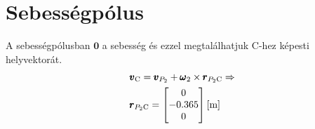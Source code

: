 \section{Sebességpólus}
A sebességpólusban $\pmb{0}$ a sebesség és ezzel megtalálhatjuk $\text{C}$-hez képesti helyvektorát.
\begin{align}
	&\pmb{v}_\text{C} = \pmb{v}_{P_2} + \pmb{\omega}_2 \times \pmb{r}_{{P_2}\text{C}} \Rightarrow \\
	&\pmb{r}_{{P_2}\text{C}} =
	\begin{bmatrix}
		0 \\ -0.365 \\ 0
	\end{bmatrix} \siunit{}{\m}
\end{align}
